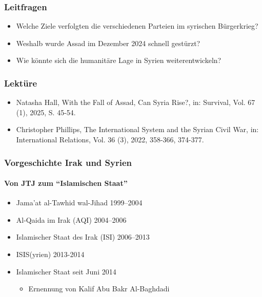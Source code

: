 {}\documentclass[a4paper]{article}
\providecommand{\tightlist}{\setlength{\itemsep}{1mm}\setlength{\parskip}{1mm}}
\begin{document}
\subsubsection{Leitfragen}\label{leitfragen-11}

\begin{itemize}
	\tightlist
	\item
	      Welche Ziele verfolgten die verschiedenen Parteien im syrischen
	      Bürgerkrieg?
	\item
	      Weshalb wurde Assad im Dezember 2024 schnell gestürzt?
	\item
	      Wie könnte sich die humanitäre Lage in Syrien weiterentwickeln?
\end{itemize}

\subsubsection{Lektüre}\label{lektuxfcre-11}

\begin{itemize}
	\tightlist
	\item
	      Natasha Hall, With the Fall of Assad, Can Syria Rise?, in: Survival,
	      Vol. 67 (1), 2025, S. 45-54.
	\item
	      Christopher Phillips, The International System and the Syrian Civil
	      War, in: International Relations, Vol. 36 (3), 2022, 358-366, 374-377.
\end{itemize}

\subsubsection{Vorgeschichte Irak und
	Syrien}\label{vorgeschichte-irak-und-syrien}

\paragraph{Von JTJ zum ``Islamischen
	Staat''}\label{von-jtj-zum-islamischen-staat}

\begin{itemize}
	\tightlist
	\item
	      Jama'at al-Tawhid wal-Jihad 1999--2004
	\item
	      Al-Qaida im Irak (AQI) 2004--2006
	\item
	      Islamischer Staat des Irak (ISI) 2006--2013
	\item
	      ISIS(yrien) 2013-2014
	\item
	      Islamischer Staat seit Juni 2014

	      \begin{itemize}
		      \tightlist
		      \item
		            Ernennung von Kalif Abu Bakr Al-Baghdadi
	      \end{itemize}
\end{itemize}
\end{document}
